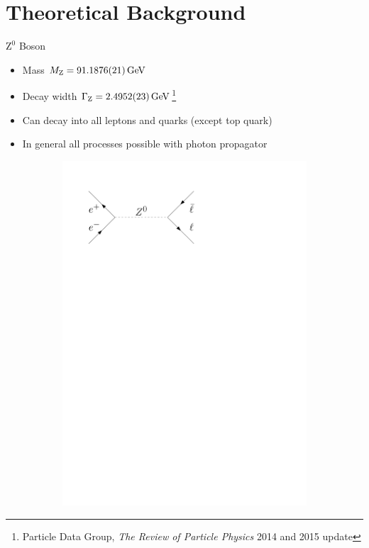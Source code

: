 \documentclass[11pt,xcolor=dvipsnames,professionalfonts]{beamer}
\begin{document}
\section{Theoretical Background}
\begin{frame}{$\mathrm{Z}^0$ Boson}
	\begin{itemize}
		\item Mass $M_\mathrm{Z} = \SI{91.1876 +- 0.0021}{GeV}$
		\item Decay width $\Gamma_\mathrm{Z} = \SI{2.4952 +- 0.0023}{GeV}$\footnote{Particle Data Group, \emph{The Review of Particle Physics} 2014 and 2015 update}
		\item Can decay into all leptons and quarks (except top quark)
		\item In general all processes possible with photon propagator
	\end{itemize}
	\begin{figure}[htb]
		\centering
		\begin{subfigure}{.28\textwidth}
			\centering
			\includegraphics[width=.8\textwidth]{./figures/theory/feynman/ll}
		\end{subfigure}
		\begin{subfigure}{.28\textwidth}

\end{subfigure}
\end{figure}
\end{frame}
\end{document}
